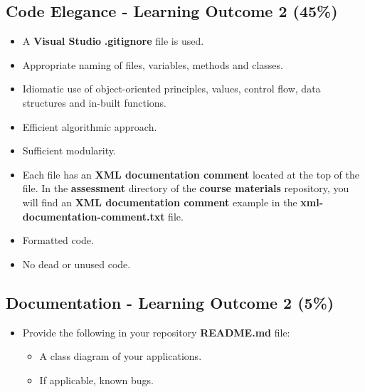 \documentclass{article}
\begin{document}
\subsection*{Code Elegance - Learning Outcome 2 (45\%)}
\begin{itemize}
    \item A \textbf{Visual Studio} \textbf{.gitignore} file is used. 
    \item Appropriate naming of files, variables, methods and classes.
    \item Idiomatic use of object-oriented principles, values, control flow, data structures and in-built functions.
    \item Efficient algorithmic approach.
    \item Sufficient modularity.
    \item Each file has an \textbf{XML documentation comment} located at the top of the file. In the \textbf{assessment} directory of the \textbf{course materials} repository, you will find an \textbf{XML documentation comment} example in the \textbf{xml-documentation-comment.txt} file.
    \item Formatted code.
    \item No dead or unused code.
\end{itemize}

\subsection*{Documentation - Learning Outcome 2 (5\%)}
\begin{itemize}
    \item Provide the following in your repository \textbf{README.md} file:
    \begin{itemize}
        \item A class diagram of your applications.
        \item If applicable, known bugs.
    \end{itemize}
\end{itemize}
\end{document}
